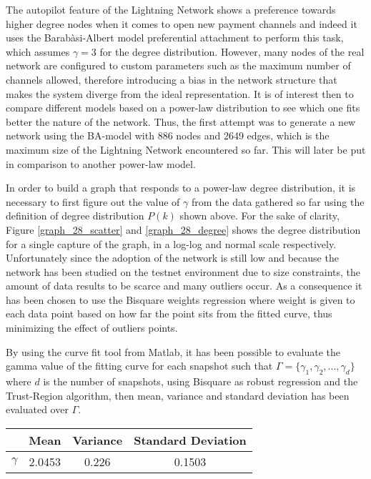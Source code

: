 	The autopilot feature of the Lightning Network shows a preference towards higher degree nodes when it comes to open new payment channels and indeed it uses the Barabàsi-Albert model preferential attachment to perform this task, which assumes $\gamma=3$ for the degree distribution. However, many nodes of the real network are configured to custom parameters such as the maximum number of channels allowed, therefore introducing a bias in the network structure that makes the system diverge from the ideal representation. It is of interest then to compare different models based on a power-law distribution to see which one fits better the nature of the network. Thus, the first attempt was to generate a new network using the BA-model with 886 nodes and 2649 edges, which is the maximum size of the Lightning Network encountered so far. This will later be put in comparison to another power-law model.
	
	In order to build a graph that responds to a power-law degree distribution, it is necessary to first figure out the value of $\gamma$ from the data gathered so far using the definition of degree distribution $P(k)$ shown above. For the sake of clarity, Figure \ref{graph_28_scatter} and \ref{graph_28_degree} shows the degree distribution for a single capture of the graph, in a log-log and normal scale respectively. Unfortunately since the adoption of the network is still low and because the network has been studied on the testnet environment due to size constraints, the amount of data results to be scarce and many outliers occur. As a consequence it has been chosen to use the Bisquare weights regression where weight is given to each data point based on how far the point sits from the fitted curve, thus minimizing the effect of outliers points.
	
	By using the curve fit tool from Matlab, it has been possible to evaluate the gamma value of the fitting curve for each snapshot such that $\Gamma = \{\gamma_1, \gamma_2, ... , \gamma_d\}$ where $d$ is the number of snapshots, using Bisquare as robust regression and the Trust-Region algorithm, then mean, variance and standard deviation has been evaluated over $\Gamma$.
	
	\begin{center}
		\begin{tabulary}{0.75\linewidth}{| L | C | C | C | }
			\hline
			& Mean & Variance & Standard Deviation \\ \hline
			$\gamma$ & 2.0453 & 0.226 & 0.1503  \\ \hline
		\end{tabulary}
	\end{center}
	
